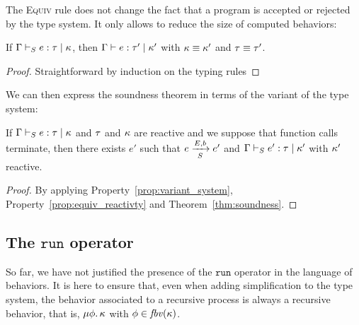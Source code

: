 \documentclass[9pt,preprint]{sigplanconf}
\begin{document}
The \textsc{Equiv} rule does not change the fact that a program is accepted or rejected by the type system. It only allows to reduce the size of computed behaviors:
\begin{property}
\label{prop:variant_system}
If $\tyjus{\tyenv}{e}{\rt}{\rk}$, then $\tyju{\tyenv}{e}{\rt'}{\rk'}$ with $\effeq{\rk}{\rk'}$ and $\tyeq{\rt}{\rt'}$.
\end{property}
\begin{proof}
Straightforward by induction on the typing rules
\end{proof}

We can then express the soundness theorem in terms of the variant of the type system:
\begin{theorem}
If \mbox{$\tyjus{\tyenv}{e}{\rt}{\rk}$} and $\rt$ and $\rk$ are reactive and we suppose that function calls terminate, then there exists $e'$ such that \mbox{$\bigstep{N}{e}{e'} {E}{b}{S}$} and \mbox{$\tyjus{\tyenv}{e'}{\rt}{\rk'}$} with $\rk'$ reactive.
\end{theorem}
\begin{proof}
By applying Property~\ref{prop:variant_system}, Property~\ref{prop:equiv_reactivty} and Theorem~\ref{thm:soundness}.
\end{proof}

\subsection{The $\mathtt{run}$ operator}
\label{sec:run}

So far, we have not justified the presence of the $\mathtt{run}$ operator in the language of behaviors. It is here to ensure that, even when adding simplification to the type system, the behavior associated to a recursive process is always a recursive behavior, that is, $\effrec{\effvar}{\rk}$ with $\effvar \in \fbv{\rk}$. 
\end{document}
